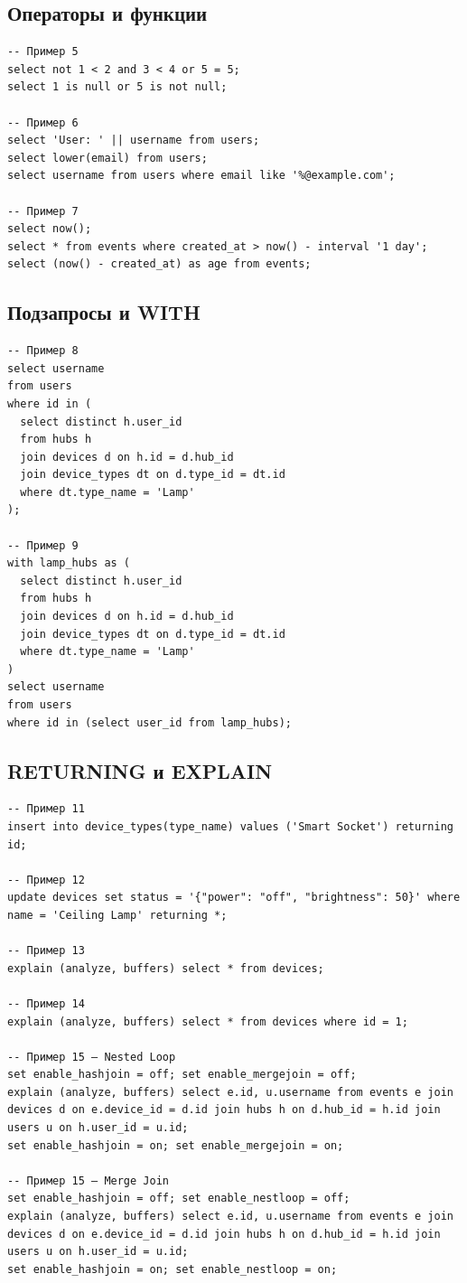 \documentclass[oneside,a4paper,14pt]{extarticle}
\begin{document}
\subsection*{Операторы и функции}
\begin{verbatim}
-- Пример 5
select not 1 < 2 and 3 < 4 or 5 = 5;
select 1 is null or 5 is not null;

-- Пример 6
select 'User: ' || username from users;
select lower(email) from users;
select username from users where email like '%@example.com';

-- Пример 7
select now();
select * from events where created_at > now() - interval '1 day';
select (now() - created_at) as age from events;
\end{verbatim}

\subsection*{Подзапросы и WITH}
\begin{verbatim}
-- Пример 8
select username 
from users 
where id in (
  select distinct h.user_id 
  from hubs h 
  join devices d on h.id = d.hub_id
  join device_types dt on d.type_id = dt.id
  where dt.type_name = 'Lamp'
);

-- Пример 9
with lamp_hubs as (
  select distinct h.user_id 
  from hubs h 
  join devices d on h.id = d.hub_id
  join device_types dt on d.type_id = dt.id
  where dt.type_name = 'Lamp'
)
select username 
from users 
where id in (select user_id from lamp_hubs);
\end{verbatim}

\subsection*{RETURNING и EXPLAIN}
\begin{verbatim}
-- Пример 11
insert into device_types(type_name) values ('Smart Socket') returning id;

-- Пример 12
update devices set status = '{"power": "off", "brightness": 50}' where name = 'Ceiling Lamp' returning *;

-- Пример 13
explain (analyze, buffers) select * from devices;

-- Пример 14
explain (analyze, buffers) select * from devices where id = 1;

-- Пример 15 — Nested Loop
set enable_hashjoin = off; set enable_mergejoin = off;
explain (analyze, buffers) select e.id, u.username from events e join devices d on e.device_id = d.id join hubs h on d.hub_id = h.id join users u on h.user_id = u.id;
set enable_hashjoin = on; set enable_mergejoin = on;

-- Пример 15 — Merge Join
set enable_hashjoin = off; set enable_nestloop = off;
explain (analyze, buffers) select e.id, u.username from events e join devices d on e.device_id = d.id join hubs h on d.hub_id = h.id join users u on h.user_id = u.id;
set enable_hashjoin = on; set enable_nestloop = on;
\end{verbatim}
\end{document}
